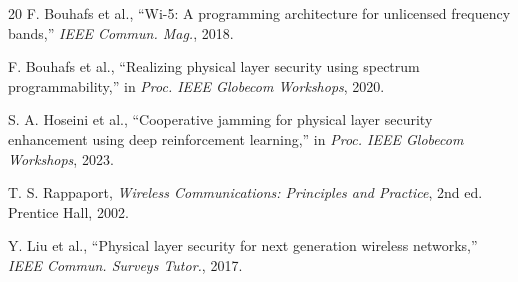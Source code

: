 \documentclass[conference]{IEEEtran}
\begin{document}
\begin{thebibliography}{20}
F. Bouhafs et al., ``Wi-5: A programming architecture for unlicensed frequency bands,'' \emph{IEEE Commun. Mag.}, 2018.

F. Bouhafs et al., ``Realizing physical layer security using spectrum programmability,'' in \emph{Proc. IEEE Globecom Workshops}, 2020.

S. A. Hoseini et al., ``Cooperative jamming for physical layer security enhancement using deep reinforcement learning,'' in \emph{Proc. IEEE Globecom Workshops}, 2023.

T. S. Rappaport, \emph{Wireless Communications: Principles and Practice}, 2nd ed. Prentice Hall, 2002.

Y. Liu et al., ``Physical layer security for next generation wireless networks,'' \emph{IEEE Commun. Surveys Tutor.}, 2017.

\end{thebibliography}
\end{document}
